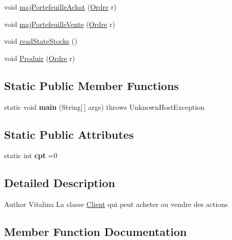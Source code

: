 \begin{DoxyCompactItemize}
\item 
void \hyperlink{classcom_1_1m1sar_1_1_client_ae58f81c93ca69cc75c923e91f758d75f}{maj\+Portefeuille\+Achat} (\hyperlink{classcom_1_1m1sar_1_1_ordre}{Ordre} r)
\item 
void \hyperlink{classcom_1_1m1sar_1_1_client_afa011fd42124137bc9131ae8b9f2851d}{maj\+Portefeuille\+Vente} (\hyperlink{classcom_1_1m1sar_1_1_ordre}{Ordre} r)
\item 
void \hyperlink{classcom_1_1m1sar_1_1_client_a289d7402a20981f2ab07159e617ec3d8}{read\+State\+Stocks} ()
\item 
void \hyperlink{classcom_1_1m1sar_1_1_client_af8ee1c17e73359f447bc14b8fe4b790c}{Produir} (\hyperlink{classcom_1_1m1sar_1_1_ordre}{Ordre} r)
\end{DoxyCompactItemize}
\subsection*{Static Public Member Functions}
\begin{DoxyCompactItemize}
\item 
\mbox{\label{classcom_1_1m1sar_1_1_client_a952cf270821d658eef12c5dca9d16133}} 
static void {\bfseries main} (String\mbox{[}$\,$\mbox{]} args)  throws Unknown\+Host\+Exception
\end{DoxyCompactItemize}
\subsection*{Static Public Attributes}
\begin{DoxyCompactItemize}
\item 
\mbox{\label{classcom_1_1m1sar_1_1_client_afea2b8c72db2abdc5d6e68e5d817bc25}} 
static int {\bfseries cpt} =0
\end{DoxyCompactItemize}


\subsection{Detailed Description}
\begin{DoxyAuthor}{Author}
Vitalina La classe \hyperlink{classcom_1_1m1sar_1_1_client}{Client} qui peut acheter ou vendre des actions 
\end{DoxyAuthor}


\subsection{Member Function Documentation}
\mbox{\label{classcom_1_1m1sar_1_1_client_a9ab9d2ee49a49ffc34d876c554bf29b3}} 
